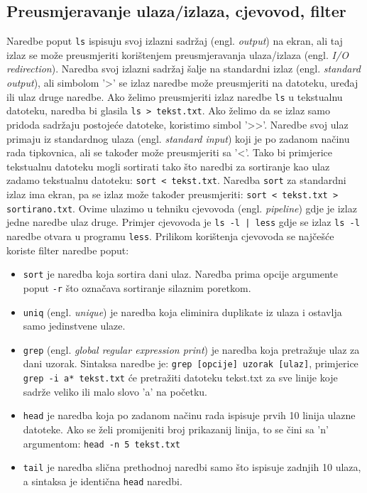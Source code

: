 \documentclass{foi}
\begin{document}
\subsection{Preusmjeravanje ulaza/izlaza, cjevovod, filter}
Naredbe poput \verb|ls| ispisuju svoj izlazni sadržaj (engl. \textit{output}) na ekran, ali taj izlaz se može preusmjeriti korištenjem preusmjeravanja ulaza/izlaza (engl. \textit{I/O redirection}). Naredba svoj izlazni sadržaj šalje na standardni izlaz (engl. \textit{standard output}), ali simbolom '>' se izlaz naredbe može preusmjeriti na datoteku, uređaj ili ulaz druge naredbe. Ako želimo preusmjeriti izlaz naredbe \verb|ls| u tekstualnu datoteku, naredba bi glasila \verb|ls > tekst.txt|. Ako želimo da se izlaz samo pridoda sadržaju postojeće datoteke, koristimo simbol '>>'. Naredbe svoj ulaz primaju iz standardnog ulaza (engl. \textit{standard input}) koji je po zadanom načinu rada tipkovnica, ali se također može preusmjeriti sa '<'. Tako bi primjerice tekstualnu datoteku mogli sortirati tako što naredbi za sortiranje kao ulaz zadamo tekstualnu datoteku: \verb|sort < tekst.txt|. Naredba \verb|sort| za standardni izlaz ima ekran, pa se izlaz može također preusmjeriti: \verb|sort < tekst.txt > sortirano.txt|. Ovime ulazimo u tehniku cjevovoda (engl. \textit{pipeline}) gdje je izlaz jedne naredbe ulaz druge.\cite{LinuxCommandIO}
Primjer cjevovoda je \verb+ls -l | less+ gdje se izlaz \verb|ls -l| naredbe otvara u programu \verb|less|. Prilikom korištenja cjevovoda se najčešće koriste filter naredbe poput:
\begin{itemize}
    \item \verb|sort| je naredba koja sortira dani ulaz. Naredba prima opcije argumente poput \verb|-r| što označava sortiranje silaznim poretkom.
    \item \verb|uniq| (engl. \textit{unique}) je naredba koja eliminira duplikate iz ulaza i ostavlja samo jedinstvene ulaze.
    \item \verb|grep| (engl. \textit{global regular expression print}) je naredba koja pretražuje ulaz za dani uzorak. Sintaksa naredbe je: \verb|grep [opcije] uzorak [ulaz]|, primjerice \texttt{grep -i a* tekst.txt} će pretražiti datoteku tekst.txt za sve linije koje sadrže veliko ili malo slovo 'a' na početku.
    \item \verb|head| je naredba koja po zadanom načinu rada ispisuje prvih 10 linija ulazne datoteke. Ako se želi promijeniti broj prikazanij linija, to se čini sa 'n' argumentom: \texttt{head -n 5 tekst.txt}
    \item \verb|tail| je naredba slična prethodnoj naredbi samo što ispisuje zadnjih 10 ulaza, a sintaksa je identična \verb|head| naredbi.
\end{itemize}
\end{document}
